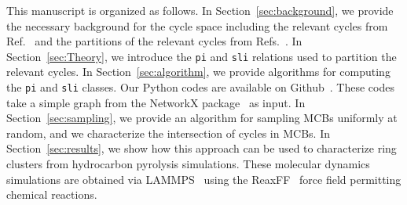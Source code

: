 \documentclass[fleqn,11pt]{article}
\begin{document}
This manuscript is organized as follows. In Section~\ref{sec:background}, we provide the necessary background for the cycle space including the relevant cycles from Ref.~\cite{vismaraUnion1997} and the partitions of the relevant cycles from Refs.~\cite{gleissInterchangeability2000,kolodzikUnique2012}. In Section~\ref{sec:Theory}, we introduce the {\tt pi} and {\tt sli} relations used to partition the relevant cycles. In Section~\ref{sec:algorithm}, we provide algorithms for computing the {\tt pi} and {\tt sli} classes. Our Python codes are available on Github~\cite{RuthGithub}. These codes take a simple graph from the NetworkX package~\cite{hagbergExploring2008} as input.
In Section~\ref{sec:sampling}, we provide an algorithm for sampling MCBs uniformly at random, and we characterize the intersection of cycles in MCBs. In Section~\ref{sec:results}, we show how this approach can be used to characterize ring clusters from hydrocarbon pyrolysis simulations. 
These molecular dynamics simulations are obtained via LAMMPS~\cite{plimptonFast1995,thompsonLAMMPS2022} using the ReaxFF~\cite{vanduinReaxFF2001,chenowethReaxFF2008,srinivasanDevelopment2015,ashrafExtension2017} force field permitting chemical reactions.

%
\end{document}
